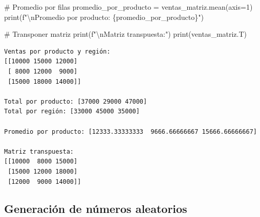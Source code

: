 \documentclass[
  doc,
  floatsintext,
  longtable,
  a4paper,
  nolmodern,
  notxfonts,
  notimes,
  12pt,
  colorlinks=true,linkcolor=blue,citecolor=blue,urlcolor=blue]{apa7}
\newenvironment{Shaded}{\begin{snugshade}}{\end{snugshade}}
\newcommand{\BuiltInTok}[1]{\textcolor[rgb]{0.00,0.23,0.31}{#1}}
\newcommand{\CharTok}[1]{\textcolor[rgb]{0.13,0.47,0.30}{#1}}
\newcommand{\CommentTok}[1]{\textcolor[rgb]{0.37,0.37,0.37}{#1}}
\newcommand{\DecValTok}[1]{\textcolor[rgb]{0.68,0.00,0.00}{#1}}
\newcommand{\NormalTok}[1]{\textcolor[rgb]{0.00,0.23,0.31}{#1}}
\newcommand{\OperatorTok}[1]{\textcolor[rgb]{0.37,0.37,0.37}{#1}}
\newcommand{\SpecialCharTok}[1]{\textcolor[rgb]{0.37,0.37,0.37}{#1}}
\newcommand{\SpecialStringTok}[1]{\textcolor[rgb]{0.13,0.47,0.30}{#1}}
\begin{document}
\begin{Shaded}
\begin{Highlighting}[]
\CommentTok{\# Promedio por filas}
\NormalTok{promedio\_por\_producto }\OperatorTok{=}\NormalTok{ ventas\_matriz.mean(axis}\OperatorTok{=}\DecValTok{1}\NormalTok{)}
\BuiltInTok{print}\NormalTok{(}\SpecialStringTok{f"}\CharTok{\textbackslash{}n}\SpecialStringTok{Promedio por producto: }\SpecialCharTok{\{}\NormalTok{promedio\_por\_producto}\SpecialCharTok{\}}\SpecialStringTok{"}\NormalTok{)}

\CommentTok{\# Transponer matriz}
\BuiltInTok{print}\NormalTok{(}\SpecialStringTok{f"}\CharTok{\textbackslash{}n}\SpecialStringTok{Matriz transpuesta:"}\NormalTok{)}
\BuiltInTok{print}\NormalTok{(ventas\_matriz.T)}
\end{Highlighting}
\end{Shaded}

\begin{verbatim}
Ventas por producto y región:
[[10000 15000 12000]
 [ 8000 12000  9000]
 [15000 18000 14000]]

Total por producto: [37000 29000 47000]
Total por región: [33000 45000 35000]

Promedio por producto: [12333.33333333  9666.66666667 15666.66666667]

Matriz transpuesta:
[[10000  8000 15000]
 [15000 12000 18000]
 [12000  9000 14000]]
\end{verbatim}

\subsection{Generación de números
aleatorios}\label{generaciuxf3n-de-nuxfameros-aleatorios}
\end{document}
